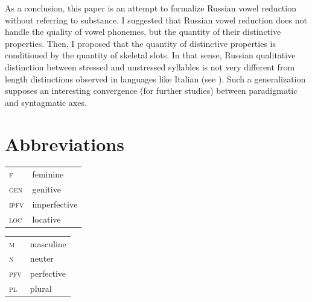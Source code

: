 \documentclass[output=paper,
modfonts,
newtxmath,
hidelinks,
]{langscibook}
\begin{document}
As a conclusion, this paper is an attempt to formalize Russian vowel reduction without referring to substance. I suggested that Russian vowel reduction does not handle the quality of vowel phonemes, but the quantity of their distinctive properties. Then, I proposed that the quantity of distinctive properties is conditioned by the quantity of skeletal slots. In that sense, Russian qualitative distinction between stressed and unstressed syllables is not very different from length distinctions observed in languages like Italian (see \citealt{Parmenter-Carman1932}). Such a generalization supposes an interesting convergence (for further studies) between paradigmatic and syntagmatic axes.


\section*{Abbreviations}

\begin{tabularx}{.5\textwidth}{@{}lQ@{}}
\textsc{f}&feminine\\
\textsc{gen}&genitive\\
\textsc{ipfv}&imperfective\\
\textsc{loc}&locative\\
\end{tabularx}%
\begin{tabularx}{.5\textwidth}{@{}lQ@{}}
\textsc{m}&masculine\\
\textsc{n}&neuter\\
\textsc{pfv}&perfective\\
\textsc{pl}&plural\\
\end{tabularx}

\sloppy
\printbibliography[heading=subbibliography,notkeyword=this]
\end{document}

